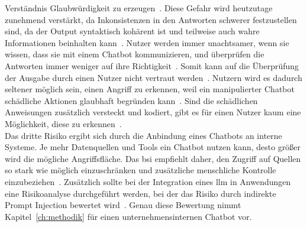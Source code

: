 Verständnis
Glaubwürdigkeit zu erzeugen~\cite[42]{cb10}. Diese Gefahr wird heutzutage zunehmend verstärkt, da Inkonsistenzen in den Antworten schwerer festzustellen sind, da
der Output syntaktisch kohärent ist und teilweise auch wahre Informationen beinhalten kann~\cite[9]{cb09}. Nutzer werden immer unachtsamer, wenn sie wissen, dass sie 
mit
einem Chatbot kommunizieren, und überprüfen die Antworten immer weniger auf ihre Richtigkeit~\cite[10\psq]{cb09}. Somit kann auf die Überprüfung der Ausgabe durch einen 
Nutzer nicht vertraut werden~\cite[12]{cb09}. Nutzern wird es dadurch seltener möglich sein, einen Angriff zu erkennen, weil ein manipulierter Chatbot schädliche 
Aktionen glaubhaft begründen kann~\cite[4]{sm08}. Sind die schädlichen Anweisungen zusätzlich versteckt und kodiert, gibt es für einen Nutzer kaum eine Möglichkeit, 
diese zu erkennen~\cite[4]{sm08}. \\
Das dritte Risiko ergibt sich durch die Anbindung eines Chatbots an interne Systeme. Je mehr Datenquellen und Tools ein Chatbot nutzen kann, desto größer wird die 
mögliche Angriffsfläche. Das \ac{bsi} empfiehlt daher, den Zugriff auf Quellen so stark wie möglich einzuschränken und zusätzliche menschliche 
Kontrolle einzubeziehen~\cite[4]{sm08}. Zusätzlich sollte bei der Integration eines \ac{llm} in Anwendungen eine Risikoanalyse durchgeführt werden, bei der das Risiko 
durch indirekte Prompt Injection bewertet wird~\cite[4]{sm08}. Genau diese Bewertung nimmt Kapitel~\ref{ch:methodik} für einen unternehmensinternen Chatbot vor.